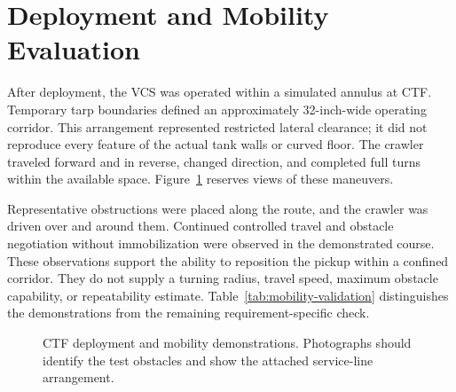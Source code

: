 \section{Deployment and Mobility Evaluation}
\label{sec:mobility-tests}
\label{sec:ctf-validation}
After deployment, the VCS was operated within a simulated annulus at CTF. Temporary tarp boundaries defined an approximately 32-inch-wide operating corridor. This arrangement represented restricted lateral clearance; it did not reproduce every feature of the actual tank walls or curved floor. The crawler traveled forward and in reverse, changed direction, and completed full turns within the available space. Figure~\ref{fig:validation-mobility} reserves views of these maneuvers.

Representative obstructions were placed along the route, and the crawler was driven over and around them. Continued controlled travel and obstacle negotiation without immobilization were observed in the demonstrated course. These observations support the ability to reposition the pickup within a confined corridor. They do not supply a turning radius, travel speed, maximum obstacle capability, or repeatability estimate. Table~\ref{tab:mobility-validation} distinguishes the demonstrations from the remaining requirement-specific check.

\begin{figure}[htbp]\centering
{}\hfill
{}\par\medskip
{}\hfill
{}
\caption{CTF deployment and mobility demonstrations. Photographs should identify the test obstacles and show the attached service-line arrangement.}
\label{fig:validation-mobility}
\end{figure}

